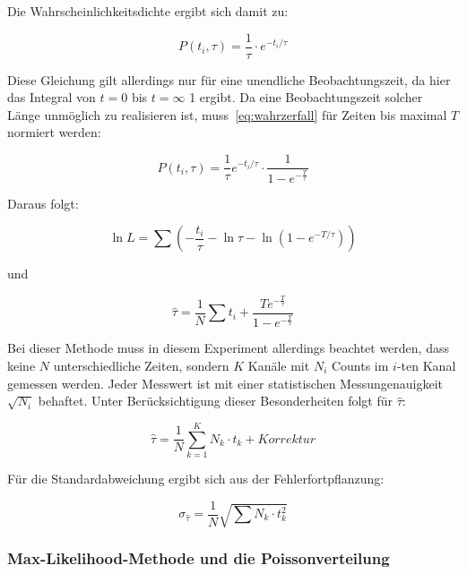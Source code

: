 \documentclass[slug=LM, room=Andreas-Schubert-Bau\,\ K\ 1A,
supervisor=Anne-Sophie\ Berthold, coursedate=13.\ 12.\ 2019]{../../Lab_Report_LaTeX/lab_report}
\begin{document}
Die Wahrscheinlichkeitsdichte ergibt sich damit zu:

\begin{equation}\label{eq:wahrzerfall}
 P(t_i,\tau) = \frac{1}{\tau} \cdot e^{-t_i/\tau}
\end{equation}

Diese Gleichung gilt allerdings nur für eine unendliche Beobachtungszeit, da hier das Integral
von \(t = 0\) bis \(t = \infty\) 1 ergibt.
Da eine Beobachtungszeit solcher Länge unmöglich zu realisieren ist, muss~\ref{eq:wahrzerfall}
für Zeiten bis maximal \(T\) normiert werden:

\begin{equation}\label{eq:modzerfall}
 P(t_i,\tau) = \frac{1}{\tau}e^{-t_i/\tau} \cdot \frac{1}{1-e^{-\frac{T}{\tau}}}
\end{equation}

Daraus folgt:

\begin{equation}\label{key}
 \ln L = \sum (-\frac{t_i}{\tau} - \ln\tau - \ln(1-e^{-T/\tau}))
\end{equation}

und

\begin{equation}\label{key}
 \hat\tau = \frac{1}{N} \sum t_i + \frac{T e^{-\frac{T}{\tau}}}{1-e^{-\frac{T}{\tau}}}
\end{equation}

Bei dieser Methode muss in diesem Experiment allerdings beachtet werden, dass keine \(N\)
unterschiedliche Zeiten, sondern \(K\) Kanäle mit \(N_i\) Counts im \(i\)-ten Kanal gemessen
werden. Jeder Messwert ist mit einer statistischen Messungenauigkeit \(\sqrt{N_i}\) behaftet.
Unter Berücksichtigung dieser Besonderheiten folgt für \(\hat\tau\):

\begin{equation}\label{key}
 \hat\tau = \frac{1}{N} \sum_{k=1}^{K}N_k\cdot t_k + Korrektur
\end{equation}

Für die Standardabweichung ergibt sich aus der Fehlerfortpflanzung:

\begin{equation}\label{key}
 \sigma_{\hat\tau} = \frac{1}{N} \sqrt{\sum N_k \cdot t_k^2}
\end{equation}

\subsubsection{Max-Likelihood-Methode und die Poissonverteilung}
\label{sec:likepoisson}
\end{document}
